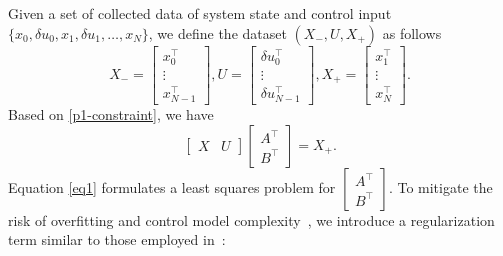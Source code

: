 \documentclass[lettersize,journal]{IEEEtran}
\begin{document}
Given a set of collected data of system state and control input $\{x_0, \delta u_0, x_1, \delta u_1, \ldots, x_{N}\}$, we define the dataset $(X_{-}, U, X_{+})$ as follows
\begin{equation}\label{dataset}
    X_{-} = \begin{bmatrix}
        x_{0}^{\top} \\ \vdots \\ x_{N-1}^{\top}
    \end{bmatrix}, 
    U = \begin{bmatrix}
        \delta u_{0}^{\top} \\ \vdots \\ \delta u_{N-1}^{\top}
    \end{bmatrix},
    X_{+} = \begin{bmatrix}
        x_{1}^{\top} \\ \vdots \\ x_{N}^{\top}
    \end{bmatrix}.
\end{equation}
Based on \eqref{p1-constraint}, we have 
\begin{equation}\label{eq1}
     \begin{bmatrix}
        X & U
    \end{bmatrix}
    \begin{bmatrix}
        A^{\top} \\ B^{\top}
    \end{bmatrix} =  X_{+}.
\end{equation}
Equation \eqref{eq1} formulates a least squares problem for $\begin{bmatrix}
        A^{\top} \\ B^{\top}
    \end{bmatrix}$. To mitigate the risk of overfitting and control model complexity~\cite{ljung2010perspectives}, we introduce a regularization term similar to those employed in~\cite{dean2018regret,abeille2017thompson}:
\end{document}
